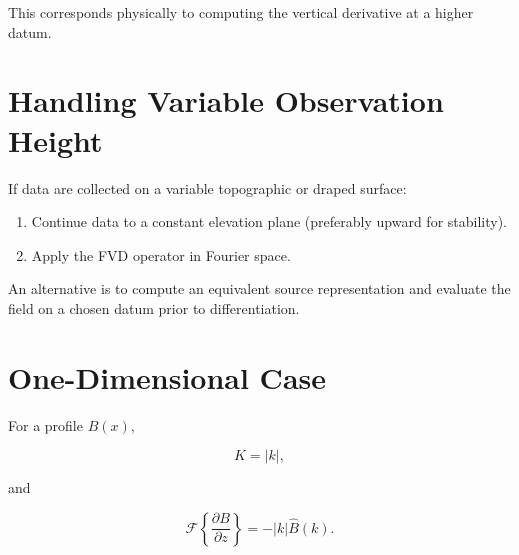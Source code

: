 \documentclass[11pt]{article}
\begin{document}
This corresponds physically to computing the vertical derivative at a higher datum.

\section{Handling Variable Observation Height}

If data are collected on a variable topographic or draped surface:

\begin{enumerate}[leftmargin=1.5em]
\item Continue data to a constant elevation plane (preferably upward for stability).
\item Apply the FVD operator in Fourier space.
\end{enumerate}

An alternative is to compute an equivalent source representation and evaluate the field on a chosen datum prior to differentiation.

\section{One-Dimensional Case}

For a profile $B(x)$,

\[
K = |k|,
\]

and

\[
\boxed{
\mathcal{F}
\left\{
\frac{\partial B}{\partial z}
\right\}
=
- |k| \hat{B}(k).
}
\]
\end{document}
